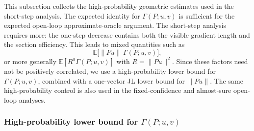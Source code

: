 \documentclass{article}
\begin{document}
This subsection collects the high-probability geometric estimates used in the
short-step analysis. The expected identity for \(\Gamma(P;u,v)\) is sufficient
for the expected open-loop approximate-oracle argument. The short-step analysis
requires more: the one-step decrease contains both the visible gradient length
and the section efficiency. This leads to mixed quantities such as
\[
\mathbb E\bigl[\|Pu\|\,\Gamma(P;u,v)\bigr],
\]
or more generally \(\mathbb E[R^a\Gamma(P;u,v)]\) with
\(R=\|Pu\|^2\). Since these factors need not be positively correlated, we use a
high-probability lower bound for \(\Gamma(P;u,v)\), combined with a one-vector
JL lower bound for \(\|Pu\|\). The same high-probability control is also used
in the fixed-confidence and almost-sure open-loop analyses.

\subsubsection{High-probability lower bound for \(\Gamma(P;u,v)\)}
\end{document}
